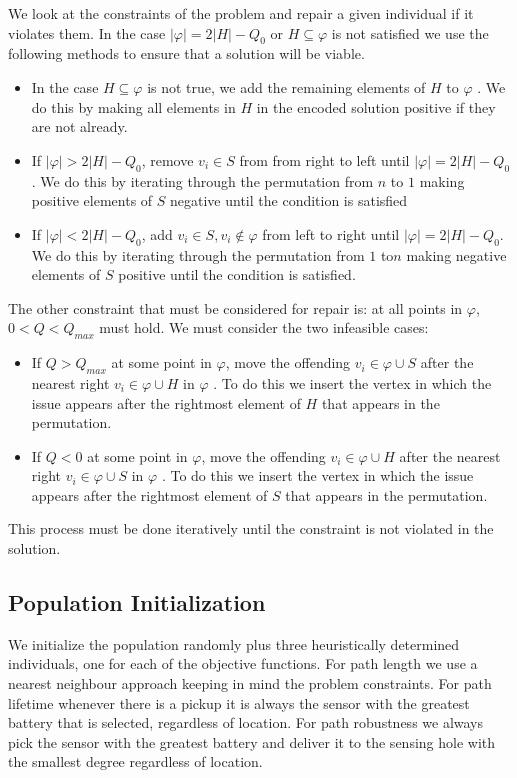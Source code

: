 \documentclass[conference]{IEEEtran}
\begin{document}
We look at the constraints of the problem and repair a given individual if it violates them. In the case $|\varphi| = 2|H|-Q_0$ or $H \subseteq \varphi$ is not satisfied we use the following methods to ensure that a solution will be viable.
\begin{itemize}
\item In the case $H \subseteq \varphi$ is not true, we add the remaining elements of $H$ to $\varphi$ . We do this by making all elements in $H$ in the encoded solution positive if they are not already.

\item If $|\varphi| > 2|H|-Q_0$, remove $v_i \in S$ from from right to left until $|\varphi| = 2|H|-Q_0$. We do this by iterating through the permutation from $n$ to $1$ making positive elements of $S$ negative until the condition is satisfied 

\item If  $|\varphi| < 2|H|-Q_0$, add $v_i \in S, v_i \notin \varphi$ from left to right until $|\varphi| = 2|H|-Q_0$. We do this by iterating through the permutation from $1$ to$n$ making negative elements of $S$ positive until the condition is satisfied.
\end{itemize}

The other constraint that must be considered for repair is: at all points in $\varphi$, $0 < Q < Q_{max}$ must hold. We must consider the two infeasible cases:
\begin{itemize}
\item If $Q > Q_{max}$ at some point in $\varphi$, move the offending $v_i \in \varphi \cup S$ after the nearest right $v_i \in \varphi \cup H$ in $\varphi$ . To do this we insert the vertex in which the issue appears after the rightmost element of $H$ that appears in the permutation.

\item If $Q < 0$ at some point in $\varphi$, move the offending $v_i \in \varphi \cup H$ after the nearest right $v_i \in \varphi \cup S$ in $\varphi$ . To do this we insert the vertex in which the issue appears after the rightmost element of $S$ that appears in the permutation.
\end{itemize}

This process must be done iteratively until the constraint is not violated in the solution.

\subsection{Population Initialization}
\label{sec:Algorithms:Initialization}
We initialize the population randomly plus three heuristically determined individuals, one for each of the objective functions. For path length we use a nearest neighbour approach keeping in mind the problem constraints. For path lifetime whenever there is a pickup it is always the sensor with the greatest battery that is selected, regardless of location. For path robustness we always pick the sensor with the greatest battery and deliver it to the sensing hole with the smallest degree regardless of location.
\end{document}
